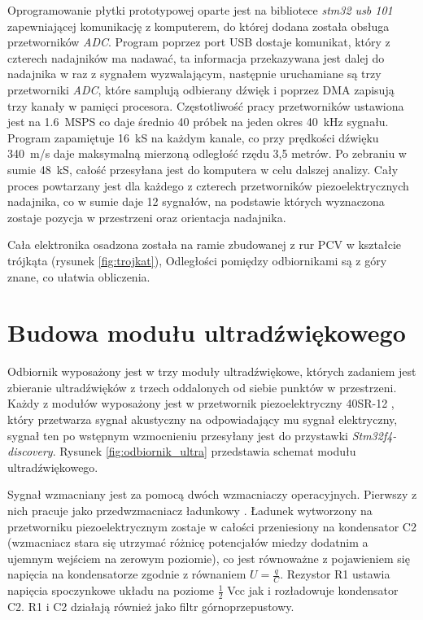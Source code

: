 Oprogramowanie płytki prototypowej oparte jest na bibliotece \textit{stm32 usb 101} \cite{bib:stm32_usb_101}
zapewniającej komunikację z komputerem, do której dodana została obsługa przetworników \textit{ADC}.
Program poprzez port USB dostaje komunikat, który z czterech nadajników ma nadawać, ta informacja przekazywana jest
dalej do nadajnika w raz z sygnałem wyzwalającym, następnie uruchamiane są trzy przetworniki \textit{ADC}, które 
samplują odbierany dźwięk i poprzez DMA zapisują trzy kanały w pamięci procesora.
Częstotliwość pracy przetworników ustawiona jest na \SI{1,6}{MSPS} co daje średnio 40 próbek na jeden okres \SI{40}{kHz} sygnału.
Program zapamiętuje \SI{16}{kS} na każdym kanale, co przy prędkości dźwięku \SI{340}{m/s} daje maksymalną mierzoną odległość rzędu 3,5 metrów.
Po zebraniu w sumie \SI{48}{kS}, całość przesyłana jest do komputera w celu dalszej analizy.
Cały proces powtarzany jest dla każdego z czterech przetworników piezoelektrycznych nadajnika, 
co w sumie daje 12 sygnałów, na podstawie których wyznaczona zostaje 
pozycja w przestrzeni oraz orientacja nadajnika.

Cała elektronika osadzona została na ramie zbudowanej z rur PCV w kształcie trójkąta (rysunek \ref{fig:trojkat}), 
Odległości pomiędzy odbiornikami są z góry znane, co ułatwia obliczenia.




\clearpage
\section{Budowa modułu ultradźwiękowego}

Odbiornik wyposażony jest w trzy moduły ultradźwiękowe, których zadaniem jest 
zbieranie ultradźwięków z trzech oddalonych od siebie punktów w
przestrzeni.
Każdy z modułów wyposażony jest w przetwornik piezoelektryczny 40SR-12 \cite{bib:40ST12},
który przetwarza sygnał akustyczny na odpowiadający mu sygnał elektryczny, sygnał ten po wstępnym wzmocnieniu
przesyłany jest do przystawki \textit{Stm32f4-discovery}.
Rysunek \ref{fig:odbiornik_ultra} przedstawia schemat modułu ultradźwiękowego.


Sygnał wzmacniany jest za pomocą dwóch wzmacniaczy operacyjnych.
Pierwszy z nich pracuje jako przedwzmacniacz ładunkowy \cite{bib:wzm_ladunkowy}.
Ładunek wytworzony na przetworniku piezoelektrycznym zostaje w całości przeniesiony na kondensator C2 
(wzmacniacz stara się utrzymać różnicę potencjałów miedzy dodatnim a ujemnym wejściem na zerowym poziomie),
co jest równoważne z pojawieniem się napięcia na kondensatorze zgodnie z równaniem $U=\frac{q}{C}$.
Rezystor R1 ustawia napięcia spoczynkowe układu na poziome $\frac{1}{2}$ Vcc jak i rozładowuje kondensator C2.
R1 i C2 działają również jako filtr górnoprzepustowy.

